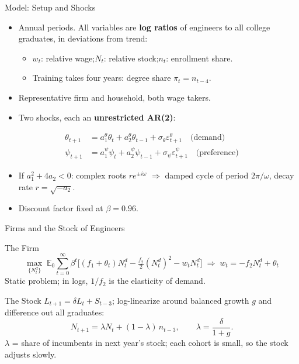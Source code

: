 \documentclass[10pt]{beamer}
\newcommand{\E}{\mathbb{E}}
\begin{document}
\begin{frame}{Model: Setup and Shocks}
  \begin{itemize}
    \item Annual periods. All variables are \textbf{log ratios} of engineers to all college graduates, in deviations from trend:
      \begin{itemize}
        \item $w_t$: relative wage;\quad $N_t$: relative stock;\quad $n_t$: enrollment share.
        \item Training takes four years: degree share $\pi_t = n_{t-4}$.
      \end{itemize}
    \item Representative firm and household, both wage takers.
    \item Two shocks, each an \textbf{unrestricted AR(2)}:
  \end{itemize}
  \begin{align*}
    \theta_{t+1} &= a_1^\theta\theta_t + a_2^\theta\theta_{t-1} + \sigma_\theta\varepsilon^\theta_{t+1} \quad \text{(demand)}\\
    \psi_{t+1} &= a_1^\psi\psi_t + a_2^\psi\psi_{t-1} + \sigma_\psi\varepsilon^\psi_{t+1} \quad \text{(preference)}
  \end{align*}
  \begin{itemize}
    \item If $a_1^2+4a_2<0$: complex roots $re^{\pm i\omega}$ $\Rightarrow$ \alert{damped cycle} of period $2\pi/\omega$, decay rate $r=\sqrt{-a_2}$.
    \item Discount factor fixed at $\beta=0.96$.
  \end{itemize}
\end{frame}

\begin{frame}{Firms and the Stock of Engineers}
  \small
  \begin{block}{The Firm}
    \[
      \max_{\{N^d_t\}}\; \E_0\sum_{t=0}^{\infty}\beta^t\Big[(f_1+\theta_t)N^d_t-\tfrac{f_2}{2}(N^d_t)^2-w_tN^d_t\Big]
      \;\Longrightarrow\;
      \boxed{w_t=-f_2N^d_t+\theta_t}
    \]
    Static problem; in logs, $1/f_2$ is the \alert{elasticity of demand}.
  \end{block}
  \vspace{0.05cm}
  \begin{block}{The Stock}
    $L_{t+1}=\delta L_t+S_{t-3}$; log-linearize around balanced growth $g$ and difference out all graduates:
    \[
      \boxed{N_{t+1}=\lambda N_t+(1-\lambda)\,n_{t-3}},\qquad \lambda=\frac{\delta}{1+g}.
    \]
    $\lambda$ = share of incumbents in next year's stock; each cohort is small, so the stock \alert{adjusts slowly}.
  \end{block}
\end{frame}
\end{document}
